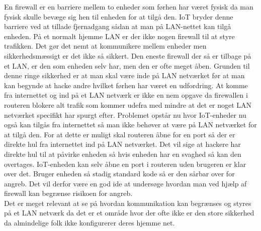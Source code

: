     En firewall er en barriere mellem to enheder som førhen har været fysisk da man fysisk skulle bevæge sig hen til enheden for at tilgå den. IoT bryder denne barriere ved at tillade fjernadgang sådan at man på LAN-nettet kan tilgå enheden. På et normalt hjemme LAN er der ikke nogen firewall til at styre trafikken. Det gør det nemt at kommunikere mellem enheder men sikkerhedsmæssigt er det ikke så sikkert. Den eneste firewall der så er tilbage på et LAN, er den som enheden selv har, men den er ofte meget åben. Grunden til denne ringe sikkerhed er at man skal være inde på LAN netværket før at man kan begynde at hacke andre hvilket førhen har været en udfordring. At komme fra internettet og ind på et LAN netværk er ikke en nem opgave da firewallen i routeren blokere alt trafik som kommer udefra med mindre at det er noget LAN netværket specifikt har spurgt efter. Problemet opstår nu hvor IoT-enheder nu også kan tilgås fra internettet så man ikke behøver at være på LAN netværket for at tilgå den. For at dette er muligt skal routeren åbne for en port så der er direkte hul fra internettet ind på LAN netværket. Det vil sige at hackere har direkte hul til at påvirke enheden så hvis enheden har en svaghed så kan den overtages. IoT-enheden kan selv åbne en port i routeren uden brugeren er klar over det. Bruger enheden så stadig standard kode så er den sårbar over for angreb. Det vil derfor være en god ide at undersøge hvordan man ved hjælp af firewall kan begrænse risikoen for angreb.\\
    Det er meget relevant at se på hvordan kommunikation kan begrænses og styres på et LAN netværk da det er et område hvor der ofte ikke er den store sikkerhed da almindelige folk ikke konfigurerer deres hjemme net.
    
    
   
       
